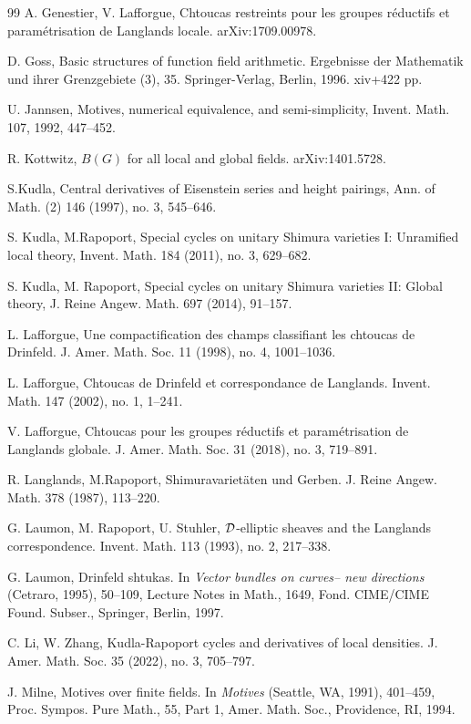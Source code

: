 \begin{thebibliography}{99}
A. Genestier, V. Lafforgue,
Chtoucas restreints pour les groupes r\'eductifs et param\'etrisation de Langlands locale.
arXiv:1709.00978.

D. Goss, 
Basic structures of function field arithmetic.
Ergebnisse der Mathematik und ihrer Grenzgebiete (3), 35. Springer-Verlag, Berlin, 1996. xiv+422 pp.

U. Jannsen,
Motives, numerical equivalence, and semi-simplicity, 
Invent. Math. 107, 1992, 447--452.

R. Kottwitz,
$B(G)$ for all local and global fields.
arXiv:1401.5728.

S.Kudla,
Central derivatives of Eisenstein series and height pairings, 
Ann. of Math. (2) 146 (1997), no. 3, 545--646.

S. Kudla, M.Rapoport,
Special cycles on unitary Shimura varieties I: Unramified local theory, 
Invent. Math. 184 (2011), no. 3, 629--682.

S. Kudla, M. Rapoport, 
Special cycles on unitary Shimura varieties II: Global theory, 
J. Reine Angew. Math. 697 (2014), 91--157.

L. Lafforgue,
Une compactification des champs classifiant les chtoucas de Drinfeld. 
J. Amer. Math. Soc. 11 (1998), no. 4, 1001--1036.

L. Lafforgue,
Chtoucas de Drinfeld et correspondance de Langlands. 
Invent. Math. 147 (2002), no. 1, 1--241.

V. Lafforgue,
Chtoucas pour les groupes r\'eductifs et param\'etrisation de Langlands globale.
J. Amer. Math. Soc. 31 (2018), no. 3, 719--891.

 
R. Langlands, M.Rapoport,
Shimuravariet\"aten und Gerben. 
J. Reine Angew. Math. 378 (1987), 113--220.

G. Laumon, M. Rapoport, U. Stuhler,
$\mathcal{D}$-elliptic sheaves and the Langlands correspondence.
Invent. Math. 113 (1993), no. 2, 217--338.

G. Laumon,
Drinfeld shtukas. 
In {\em Vector bundles on curves-- new directions} (Cetraro, 1995), 50--109, Lecture Notes in Math., 1649, Fond. CIME/CIME Found. Subser., Springer, Berlin, 1997.

C. Li, W. Zhang,
Kudla-Rapoport cycles and derivatives of local densities. 
J. Amer. Math. Soc. 35 (2022), no. 3, 705--797. 

J. Milne, 
Motives over finite fields.
In {\em Motives} (Seattle, WA, 1991), 401--459, 
Proc. Sympos. Pure Math., 55, Part 1, Amer. Math. Soc., Providence, RI, 1994.


\end{thebibliography}
